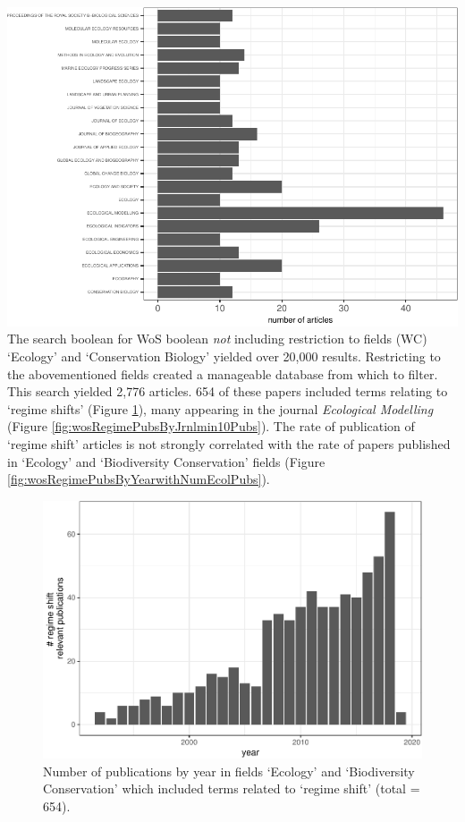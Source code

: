 \documentclass[12pt,twoside,openany]{reedthesis}
\begin{document}
\includegraphics{_myDissertation_files/figure-latex/wosRegimePubsByJrnlmin10Pubs-1.pdf}
The search boolean for WoS boolean \emph{not} including restriction to fields (WC) `Ecology' and `Conservation Biology' yielded over 20,000 results. Restricting to the abovementioned fields created a manageable database from which to filter. This search yielded 2,776 articles. 654 of these papers included terms relating to `regime shifts' (Figure \ref{fig:wosRegimePubsByYear}), many appearing in the journal \emph{Ecological Modelling} (Figure \ref{fig:wosRegimePubsByJrnlmin10Pubs}). The rate of publication of `regime shift' articles is not strongly correlated with the rate of papers published in `Ecology' and `Biodiversity Conservation' fields (Figure \ref{fig:wosRegimePubsByYearwithNumEcolPubs}).
\begin{figure}
\centering
\includegraphics{_myDissertation_files/figure-latex/wosRegimePubsByYear-1.pdf}
\caption{\label{fig:wosRegimePubsByYear}Number of publications by year in fields `Ecology' and `Biodiversity Conservation' which included terms related to `regime shift' (total = 654).}
\end{figure}
\end{document}
